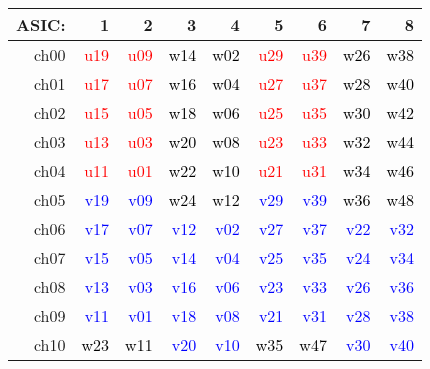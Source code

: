 \begin{center}
\begin{tabular}{r|rrrrrrrr}
\hline
ASIC:&1&2&3&4&5&6&7&8\\
\hline
ch00 & \textcolor{red}{u19} & \textcolor{red}{u09} & \textcolor{black}{w14} & \textcolor{black}{w02} & \textcolor{red}{u29} & \textcolor{red}{u39} & \textcolor{black}{w26} & \textcolor{black}{w38}\\
ch01 & \textcolor{red}{u17} & \textcolor{red}{u07} & \textcolor{black}{w16} & \textcolor{black}{w04} & \textcolor{red}{u27} & \textcolor{red}{u37} & \textcolor{black}{w28} & \textcolor{black}{w40}\\
ch02 & \textcolor{red}{u15} & \textcolor{red}{u05} & \textcolor{black}{w18} & \textcolor{black}{w06} & \textcolor{red}{u25} & \textcolor{red}{u35} & \textcolor{black}{w30} & \textcolor{black}{w42}\\
ch03 & \textcolor{red}{u13} & \textcolor{red}{u03} & \textcolor{black}{w20} & \textcolor{black}{w08} & \textcolor{red}{u23} & \textcolor{red}{u33} & \textcolor{black}{w32} & \textcolor{black}{w44}\\
ch04 & \textcolor{red}{u11} & \textcolor{red}{u01} & \textcolor{black}{w22} & \textcolor{black}{w10} & \textcolor{red}{u21} & \textcolor{red}{u31} & \textcolor{black}{w34} & \textcolor{black}{w46}\\
ch05 & \textcolor{blue}{v19} & \textcolor{blue}{v09} & \textcolor{black}{w24} & \textcolor{black}{w12} & \textcolor{blue}{v29} & \textcolor{blue}{v39} & \textcolor{black}{w36} & \textcolor{black}{w48}\\
ch06 & \textcolor{blue}{v17} & \textcolor{blue}{v07} & \textcolor{blue}{v12} & \textcolor{blue}{v02} & \textcolor{blue}{v27} & \textcolor{blue}{v37} & \textcolor{blue}{v22} & \textcolor{blue}{v32}\\
ch07 & \textcolor{blue}{v15} & \textcolor{blue}{v05} & \textcolor{blue}{v14} & \textcolor{blue}{v04} & \textcolor{blue}{v25} & \textcolor{blue}{v35} & \textcolor{blue}{v24} & \textcolor{blue}{v34}\\
ch08 & \textcolor{blue}{v13} & \textcolor{blue}{v03} & \textcolor{blue}{v16} & \textcolor{blue}{v06} & \textcolor{blue}{v23} & \textcolor{blue}{v33} & \textcolor{blue}{v26} & \textcolor{blue}{v36}\\
ch09 & \textcolor{blue}{v11} & \textcolor{blue}{v01} & \textcolor{blue}{v18} & \textcolor{blue}{v08} & \textcolor{blue}{v21} & \textcolor{blue}{v31} & \textcolor{blue}{v28} & \textcolor{blue}{v38}\\
ch10 & \textcolor{black}{w23} & \textcolor{black}{w11} & \textcolor{blue}{v20} & \textcolor{blue}{v10} & \textcolor{black}{w35} & \textcolor{black}{w47} & \textcolor{blue}{v30} & \textcolor{blue}{v40}\\

\end{tabular}
\end{center}
